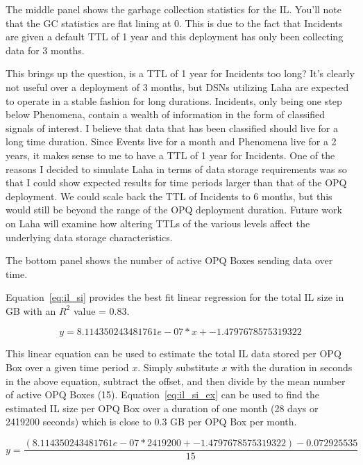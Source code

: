The middle panel shows the garbage collection statistics for the IL. You'll note that the GC statistics are flat lining at 0. This is due to the fact that Incidents are given a default TTL of 1 year and this deployment has only been collecting data for 3 months.

This brings up the question, is a TTL of 1 year for Incidents too long? It's clearly not useful over a deployment of 3 months, but DSNs utilizing Laha are expected to operate in a stable fashion for long durations. Incidents, only being one step below Phenomena, contain a wealth of information in the form of classified signals of interest. I believe that data that has been classified should live for a long time duration. Since Events live for a month and Phenomena live for a 2 years, it makes sense to me to have a TTL of 1 year for Incidents. One of the reasons I decided to simulate Laha in terms of data storage requirements was so that I could show expected results for time periods larger than that of the OPQ deployment. We could scale back the TTL of Incidents to 6 months, but this would still be beyond the range of the OPQ deployment duration. Future work on Laha will examine how altering TTLs of the various levels affect the underlying data storage characteristics.

The bottom panel shows the number of active OPQ Boxes sending data over time.

Equation~\ref{eq:il_si} provides the best fit linear regression for the total IL size in GB with an $R^2$ value = 0.83.

\begin{equation}
    y = 8.114350243481761e-07 * x + -1.4797678575319322
    \label{eq:il_si}
\end{equation}

This linear equation can be used to estimate the total IL data stored per OPQ Box over a given time period $x$. Simply substitute $x$ with the duration in seconds in the above equation, subtract the offset, and then divide by the mean number of active OPQ Boxes (15). Equation~\ref{eq:il_si_ex} can be used to find the estimated IL size per OPQ Box over a duration of one month (28 days or 2419200 seconds) which is close to 0.3 GB per OPQ Box per month.

\begin{equation}
    y = \frac{(8.114350243481761e-07 * 2419200 + -1.4797678575319322) - 0.072925535}{15}
    \label{eq:il_si_ex}
\end{equation}

